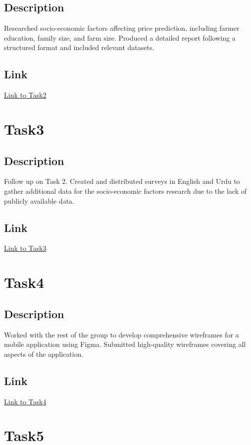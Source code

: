 \documentclass[12pt]{article}
\begin{document}
\subsection{Description}
Researched socio-economic factors affecting price prediction, including farmer education, family size, and farm size. Produced a detailed report following a structured format and included relevant datasets.

\subsection{Link}
\href{https://github.com/msaadg/PAR-Project/tree/main/Task2}{Link to Task2}

\section{Task3}
\subsection{Description}
Follow up on Task 2. Created and distributed surveys in English and Urdu to gather additional data for the socio-economic factors research due to the lack of publicly available data.

\subsection{Link}
\href{https://github.com/msaadg/PAR-Project/tree/main/Task3}{Link to Task3}

\section{Task4}
\subsection{Description}
Worked with the rest of the group to develop comprehensive wireframes for a mobile application using Figma. Submitted high-quality wireframes covering all aspects of the application.

\subsection{Link}
\href{https://www.figma.com/design/n68hivBt1gcIYD69tYe5iD/PAR-App-Design?node-id=0-1&t=qZkzaQtkCGJiRnrD-1}{Link to Task4}

\section{Task5}
\end{document}

